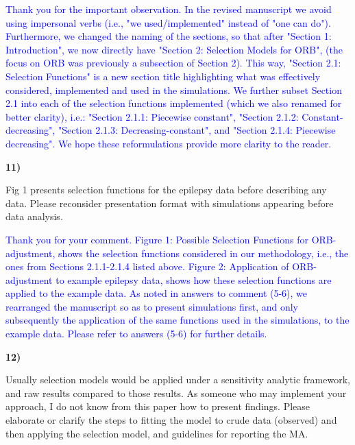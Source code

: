 \documentclass{article}
\begin{document}
\bigskip

\textcolor{blue}{Thank you for the important observation. In the revised manuscript we avoid using impersonal verbs (i.e., "we used/implemented" instead of "one can do"). Furthermore, we changed the naming of the sections, so that after "Section 1: Introduction", we now directly have "Section 2: Selection Models for ORB", (the focus on ORB was previously a subsection of Section 2). This way, "Section 2.1: Selection Functions" is a new section title highlighting what was effectively considered, implemented and used in the simulations. We further subset Section 2.1 into each of the selection functions implemented (which we also renamed for better clarity), i.e.: "Section 2.1.1: Piecewise constant", "Section 2.1.2: Constant-decreasing", "Section 2.1.3: Decreasing-constant", and "Section 2.1.4: Piecewise decreasing". We hope these reformulations provide more clarity to the reader.}

\bigskip


\textbf{11)}

\bigskip

Fig 1 presents selection functions for the epilepsy data before describing any data. Please reconsider presentation format with simulations appearing before data analysis. 

\bigskip

\textcolor{blue}{Thank you for your comment. Figure 1: Possible Selection Functions for ORB-adjustment, shows the selection functions considered in our methodology, i.e., the ones from Sections 2.1.1-2.1.4 listed above. Figure 2: Application of ORB-adjustment to example epilepsy data, shows how these selection functions are applied to the example data. As noted in answers to comment (5-6), we rearranged the manuscript so as to present simulations first, and only subsequently the application of the same functions used in the simulations, to the example data. Please refer to answers (5-6) for further details.}

\bigskip

\textbf{12)}

\bigskip

Usually selection models would be applied under a sensitivity analytic framework, and raw results compared to those results. As someone who may implement your approach, I do not know from this paper how to present findings. Please elaborate or clarify the steps to fitting the model to crude data (observed) and then applying the selection model, and guidelines for reporting the MA.
\end{document}

